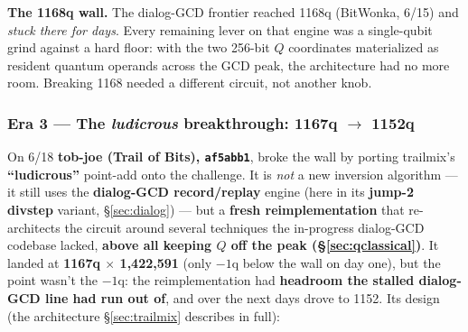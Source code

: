 \documentclass[11pt,a4paper]{article}
\begin{document}
\textbf{The 1168q wall.} The dialog-GCD frontier reached 1168q (BitWonka, 6/15) and \emph{stuck there
for days}. Every remaining lever on that engine was a single-qubit grind against a hard floor: with
the two 256-bit $Q$ coordinates materialized as resident quantum operands across the GCD peak, the
architecture had no more room. Breaking 1168 needed a different circuit, not another knob.

\subsubsection{Era 3 --- The \emph{ludicrous} breakthrough: 1167q $\to$ 1152q}

On 6/18 \textbf{tob-joe (Trail of Bits), \texttt{af5abb1}}, broke the wall by porting trailmix's
\textbf{``ludicrous''} point-add onto the challenge. It is \emph{not} a new inversion algorithm --- it
still uses the \textbf{dialog-GCD record/replay} engine (here in its \textbf{jump-2 divstep} variant,
\S\ref{sec:dialog}) --- but a \textbf{fresh reimplementation} that re-architects the circuit around
several techniques the in-progress dialog-GCD codebase lacked, \textbf{above all keeping $Q$ off the
peak (\S\ref{sec:qclassical})}. It landed at \textbf{1167q $\times$ 1{,}422{,}591} (only $-1$q below
the wall on day one), but the point wasn't the $-1$q: the reimplementation had \textbf{headroom the
stalled dialog-GCD line had run out of}, and over the next days drove to 1152. Its design (the
architecture \S\ref{sec:trailmix} describes in full):
\end{document}
